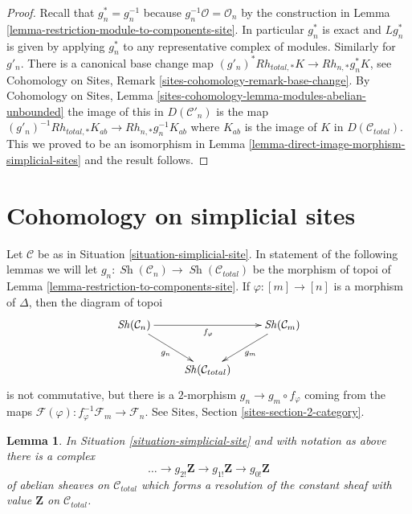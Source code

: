 \documentclass{stacks-project}
\theoremstyle{plain}
\newtheorem{lemma}[subsection]{Lemma}
\theoremstyle{definition}
\theoremstyle{remark}
\numberwithin{equation}{subsection}
\def\Sh{\mathop{\mathit{Sh}}\nolimits}
\begin{document}
\begin{proof}
Recall that $g_n^* = g_n^{-1}$ because $g_n^{-1}\mathcal{O} = \mathcal{O}_n$
by the construction in Lemma \ref{lemma-restriction-module-to-components-site}.
In particular $g_n^*$ is exact and $Lg_n^*$ is given by applying $g_n^*$
to any representative complex of modules. Similarly for $g'_n$.
There is a canonical base change map
$(g'_n)^*Rh_{total, *}K \to Rh_{n, *}g_n^*K$, see
Cohomology on Sites, Remark \ref{sites-cohomology-remark-base-change}.
By Cohomology on Sites, Lemma
\ref{sites-cohomology-lemma-modules-abelian-unbounded}
the image of this in $D(\mathcal{C}'_n)$ is the map
$(g'_n)^{-1}Rh_{total, *}K_{ab} \to Rh_{n, *}g_n^{-1}K_{ab}$
where $K_{ab}$ is the image of $K$ in $D(\mathcal{C}_{total})$.
This we proved to be an isomorphism in
Lemma \ref{lemma-direct-image-morphism-simplicial-sites}
and the result follows.
\end{proof}








\section{Cohomology on simplicial sites}
\label{section-cohomology-simplicial-sites}

\noindent
Let $\mathcal{C}$ be as in Situation \ref{situation-simplicial-site}.
In statement of the following lemmas we will let
$g_n : \Sh(\mathcal{C}_n) \to \Sh(\mathcal{C}_{total})$ be the
morphism of topoi of
Lemma \ref{lemma-restriction-to-components-site}. If $\varphi : [m] \to [n]$
is a morphism of $\Delta$, then the diagram of topoi
$$
\xymatrix{
\Sh(\mathcal{C}_n) \ar[rd]_{g_n} \ar[rr]_{f_\varphi} & &
\Sh(\mathcal{C}_m) \ar[ld]^{g_m} \\
& \Sh(\mathcal{C}_{total})
}
$$
is not commutative, but there is a $2$-morphism $g_n \to g_m \circ f_\varphi$
coming from the maps
$\mathcal{F}(\varphi) : f_\varphi^{-1}\mathcal{F}_m \to \mathcal{F}_n$.
See Sites, Section \ref{sites-section-2-category}.

\begin{lemma}
\label{lemma-simplicial-resolution-Z-site}
In Situation \ref{situation-simplicial-site} and with notation as above
there is a complex
$$
\ldots \to g_{2!}\mathbf{Z} \to g_{1!}\mathbf{Z} \to g_{0!}\mathbf{Z}
$$
of abelian sheaves on $\mathcal{C}_{total}$ which forms a resolution of
the constant sheaf with value $\mathbf{Z}$ on $\mathcal{C}_{total}$.
\end{lemma}
\end{document}
